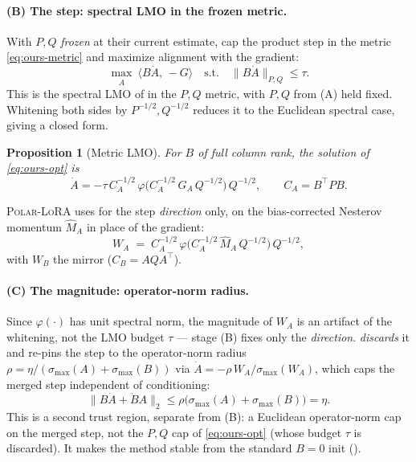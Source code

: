 \documentclass[11pt]{article}
\newcommand{\smax}{\sigma_{\max}}
\newcommand{\polar}{\varphi}                 %
\newcommand{\methodname}{\textsc{Polar-LoRA}\xspace}
\theoremstyle{plain}
\newtheorem{proposition}{Proposition}
\theoremstyle{definition}
\theoremstyle{remark}
\begin{document}
\paragraph{(B) The step: spectral LMO in the frozen metric.} With $P,Q$ \emph{frozen} at their current estimate, cap the product step in the metric \eqref{eq:ours-metric} and maximize alignment with the gradient:
\begin{equation}
  \max_{\dot A}\ \langle B\dot A,\,-G\rangle
  \quad\text{s.t.}\quad
  \|B\dot A\|_{P,Q}\le\tau .
  \label{eq:ours-opt}
\end{equation}
This is the spectral LMO of  in the $P,Q$ metric, with $P,Q$ from (A) held fixed. Whitening both sides by $P^{-1/2},Q^{-1/2}$ reduces it to the Euclidean spectral case, giving a closed form.
\begin{proposition}[Metric LMO]\label{prop:ours}
For $B$ of full column rank, the solution of \eqref{eq:ours-opt} is
\begin{equation*}
  \dot A = -\tau\,C_A^{-1/2}\,\polar\!\big(C_A^{-1/2}\,G_A\,Q^{-1/2}\big)\,Q^{-1/2},
  \qquad C_A=B^\top P B .
\end{equation*}
\end{proposition}
\medskip
\noindent \methodname{} uses  for the step \emph{direction} only, on the bias-corrected Nesterov momentum $\hat M_A$ in place of the gradient:
\begin{equation}
  W_A \;=\; C_A^{-1/2}\,\polar\!\big(C_A^{-1/2}\,\hat M_A\,Q^{-1/2}\big)\,Q^{-1/2},
  \label{eq:ours-lmo}
\end{equation}
with $W_B$ the mirror ($C_B=AQA^\top$).

\paragraph{(C) The magnitude: operator-norm radius.} Since $\polar(\cdot)$ has unit spectral norm, the magnitude of $W_A$ is an artifact of the whitening, not the LMO budget $\tau$ --- stage (B) fixes only the \emph{direction}.  \emph{discards} it and re-pins the step to the operator-norm radius $\rho=\eta/(\smax(A)+\smax(B))$ via $\dot A=-\rho\,W_A/\smax(W_A)$, which caps the merged step independent of conditioning:
\begin{equation}
  \|B\dot A+\dot B A\|_2\le\rho\big(\smax(A)+\smax(B)\big)=\eta .
  \label{eq:ours-prodcap}
\end{equation}
This is a second trust region, separate from (B): a Euclidean operator-norm cap on the merged step, not the $P,Q$ cap of \eqref{eq:ours-opt} (whose budget $\tau$ is discarded). It makes the method stable from the standard $B{=}0$ init ().
\end{document}
